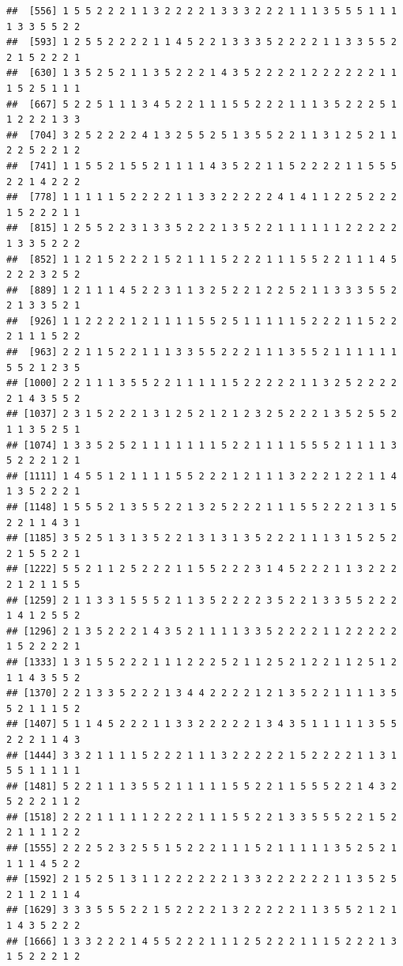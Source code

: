 \documentclass[]{book}
\begin{document}
\begin{verbatim}
##  [556] 1 5 5 2 2 2 1 1 3 2 2 2 2 1 3 3 3 2 2 2 1 1 1 3 5 5 5 1 1 1 1 3 3 5 5 2 2
##  [593] 1 2 5 5 2 2 2 2 1 1 4 5 2 2 1 3 3 3 5 2 2 2 2 1 1 3 3 5 5 2 2 1 5 2 2 2 1
##  [630] 1 3 5 2 5 2 1 1 3 5 2 2 2 1 4 3 5 2 2 2 2 1 2 2 2 2 2 2 1 1 1 5 2 5 1 1 1
##  [667] 5 2 2 5 1 1 1 3 4 5 2 2 1 1 1 5 5 2 2 2 1 1 1 3 5 2 2 2 5 1 1 2 2 2 1 3 3
##  [704] 3 2 5 2 2 2 2 4 1 3 2 5 5 2 5 1 3 5 5 2 2 1 1 3 1 2 5 2 1 1 2 2 5 2 2 1 2
##  [741] 1 1 5 5 2 1 5 5 2 1 1 1 1 4 3 5 2 2 1 1 5 2 2 2 2 1 1 5 5 5 2 2 1 4 2 2 2
##  [778] 1 1 1 1 1 5 2 2 2 2 1 1 3 3 2 2 2 2 2 4 1 4 1 1 2 2 5 2 2 2 1 5 2 2 2 1 1
##  [815] 1 2 5 5 2 2 3 1 3 3 5 2 2 2 1 3 5 2 2 1 1 1 1 1 1 2 2 2 2 2 1 3 3 5 2 2 2
##  [852] 1 1 2 1 5 2 2 2 1 5 2 1 1 1 5 2 2 2 1 1 1 5 5 2 2 1 1 1 4 5 2 2 2 3 2 5 2
##  [889] 1 2 1 1 1 4 5 2 2 3 1 1 3 2 5 2 2 1 2 2 5 2 1 1 3 3 3 5 5 2 2 1 3 3 5 2 1
##  [926] 1 1 2 2 2 2 1 2 1 1 1 1 5 5 2 5 1 1 1 1 1 5 2 2 2 1 1 5 2 2 2 1 1 1 5 2 2
##  [963] 2 2 1 1 5 2 2 1 1 1 3 3 5 5 2 2 2 1 1 1 3 5 5 2 1 1 1 1 1 1 5 5 2 1 2 3 5
## [1000] 2 2 1 1 1 3 5 5 2 2 1 1 1 1 1 5 2 2 2 2 2 1 1 3 2 5 2 2 2 2 2 1 4 3 5 5 2
## [1037] 2 3 1 5 2 2 2 1 3 1 2 5 2 1 2 1 2 3 2 5 2 2 2 1 3 5 2 5 5 2 1 1 3 5 2 5 1
## [1074] 1 3 3 5 2 5 2 1 1 1 1 1 1 1 5 2 2 1 1 1 1 5 5 5 2 1 1 1 1 3 5 2 2 2 1 2 1
## [1111] 1 4 5 5 1 2 1 1 1 1 5 5 2 2 2 1 2 1 1 1 3 2 2 2 1 2 2 1 1 4 1 3 5 2 2 2 1
## [1148] 1 5 5 5 2 1 3 5 5 2 2 1 3 2 5 2 2 2 1 1 1 5 5 2 2 2 1 3 1 5 2 2 1 1 4 3 1
## [1185] 3 5 2 5 1 3 1 3 5 2 2 1 3 1 3 1 3 5 2 2 2 1 1 1 3 1 5 2 5 2 2 1 5 5 2 2 1
## [1222] 5 5 2 1 1 2 5 2 2 2 1 1 5 5 2 2 2 3 1 4 5 2 2 2 1 1 3 2 2 2 2 1 2 1 1 5 5
## [1259] 2 1 1 3 3 1 5 5 5 2 1 1 3 5 2 2 2 2 3 5 2 2 1 3 3 5 5 2 2 2 1 4 1 2 5 5 2
## [1296] 2 1 3 5 2 2 2 1 4 3 5 2 1 1 1 1 3 3 5 2 2 2 2 1 1 2 2 2 2 2 1 5 2 2 2 2 1
## [1333] 1 3 1 5 5 2 2 2 1 1 1 2 2 2 5 2 1 1 2 5 2 1 2 2 1 1 2 5 1 2 1 1 4 3 5 5 2
## [1370] 2 2 1 3 3 5 2 2 2 1 3 4 4 2 2 2 2 1 2 1 3 5 2 2 1 1 1 1 3 5 5 2 1 1 1 5 2
## [1407] 5 1 1 4 5 2 2 2 1 1 3 3 2 2 2 2 2 1 3 4 3 5 1 1 1 1 1 3 5 5 2 2 2 1 1 4 3
## [1444] 3 3 2 1 1 1 1 5 2 2 2 1 1 1 3 2 2 2 2 2 1 5 2 2 2 2 1 1 3 1 5 5 1 1 1 1 1
## [1481] 5 2 2 1 1 1 3 5 5 2 1 1 1 1 1 5 5 2 2 1 1 5 5 5 2 2 1 4 3 2 5 2 2 2 1 1 2
## [1518] 2 2 2 1 1 1 1 1 2 2 2 2 1 1 1 5 5 2 2 1 3 3 5 5 5 2 2 1 5 2 2 1 1 1 1 2 2
## [1555] 2 2 2 5 2 3 2 5 5 1 5 2 2 2 1 1 1 5 2 1 1 1 1 1 3 5 2 5 2 1 1 1 1 4 5 2 2
## [1592] 2 1 5 2 5 1 3 1 1 2 2 2 2 2 2 1 3 3 2 2 2 2 2 2 1 1 3 5 2 5 2 1 1 2 1 1 4
## [1629] 3 3 3 5 5 5 2 2 1 5 2 2 2 2 1 3 2 2 2 2 2 1 1 3 5 5 2 1 2 1 1 4 3 5 2 2 2
## [1666] 1 3 3 2 2 2 1 4 5 5 2 2 2 1 1 1 2 5 2 2 2 1 1 1 5 2 2 2 1 3 1 5 2 2 2 1 2

\end{verbatim}
\end{document}
